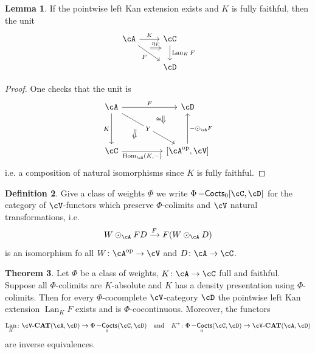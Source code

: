 \documentclass[a4paper,11pt,oneside,openany]{scrbook}
\newcommand{\catname}[1]{{\normalfont\textbf{#1}}}
\newcommand{\CAT}{\catname{CAT}}
\newcommand{\from}{\colon}
\newcommand{\iso}{\cong}
\DeclareMathOperator{\Hom}{\text{Hom}}
\DeclareMathOperator{\op}{\text{op}}
\DeclareMathOperator{\Cocts}{-\mathsf{Cocts}}
\DeclareMathOperator{\Lan}{Lan}
\theoremstyle{definition}
\newtheorem{thm}{Theorem}[section] %
\theoremstyle{definition}
\newtheorem{defn}[thm]{Definition} %
\newtheorem{lemma}[thm]{Lemma}
\begin{document}
\begin{lemma}
    If the pointwise left Kan extension exists and $ K $ is fully faithful, then the unit
    \begin{displaymath}
        \begin{tikzcd}
	    \cA \arrow[r, "K"]\arrow[rd,"F"', 	""{name=F,marking,near start}] 	 &
	    \cC \arrow[d, "{\Lan_K F}",		""{name=L,marking,above, near start}]	\\
	    & \cD
	    \arrow[Rightarrow, from=F, to=L, shorten <=10pt, shorten >=10pt, start anchor={north west}, end anchor={[yshift=1pt]}, "\eta_F"]
        \end{tikzcd}
    \end{displaymath}
\end{lemma}
\begin{proof}
    One checks that the unit is
    \begin{displaymath}
	\begin{tikzcd}[column sep = huge, row sep =huge]
            \cA
	    \arrow[r,"F", ""{name=F, near end}]
	    \arrow[d,"K"']
	    \arrow[rd, "Y"description, ""{name=Y, near end}, ""{name=Z, near start}]
	    &
	    \cD
	    \\
	    \cC
	    \arrow[r, "{\Hom_{\cA}(K,-)}"', ""{name=H, near start}]
	    &
	    \lbrack\cA^{\op},\cV\rbrack
	    \arrow[u, "-\odot_\cA F"']
	    \arrow[Rightarrow, from =F, to=Y, shorten <= 10pt, shorten >=10pt, "\iso"']
	    \arrow[Rightarrow, from =Z, to=H, shorten <= 10pt, shorten >=10pt]
        \end{tikzcd}
    \end{displaymath}
    i.e. a composition of natural isomorphisms since $ K $ is fully faithful.
\end{proof}
\begin{defn}
    Give a class of weights $ \Phi $ we write $ \Phi\Cocts_0[\cC,\cD] $ for the category of $ \cV $-functors which preserve $ \Phi $-colimits and $ \cV $ natural transformations, i.e.
    \begin{displaymath}
	W\odot _\cA FD \xrightarrow{F}  F(W\odot_\cA D)
    \end{displaymath}
    is an isomorphism fo all $ W \from \cA ^{\op} \to \cV $ and $ D \from \cA \to \cC $.
\end{defn}
\begin{thm}
    Let $ \Phi $ be a class of weights, $ K \from \cA \to \cC $ full and faithful.
    Suppose all $ \Phi $-colimits are $ K $-absolute and $ K $ has a density presentation using $ \Phi $-colimits.
    Then for every $ \Phi $-cocomplete $ \cV $-category $ \cD $ the pointwise left Kan extension $ \Lan_K F $ exists and is $ \Phi $-cocontinuous.
    Moreover, the functors
    \begin{displaymath}
	\Lan_K \from \cV\text{-}\CAT(\cA,\cD) \to \Phi\Cocts_0(\cC,\cD) \quad \text{and} \quad K^*\from \Phi\Cocts_0(\cC,\cD) \to \cV\text{-}\CAT(\cA,\cD)
    \end{displaymath}
    are inverse equivalences.
\end{thm}
\end{document}
